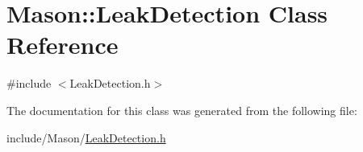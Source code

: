 \hypertarget{class_mason_1_1_leak_detection}{}\section{Mason\+:\+:Leak\+Detection Class Reference}
\label{class_mason_1_1_leak_detection}


{\ttfamily \#include $<$Leak\+Detection.\+h$>$}



The documentation for this class was generated from the following file\+:\begin{DoxyCompactItemize}
\item 
include/\+Mason/\hyperlink{_leak_detection_8h}{Leak\+Detection.\+h}\end{DoxyCompactItemize}
